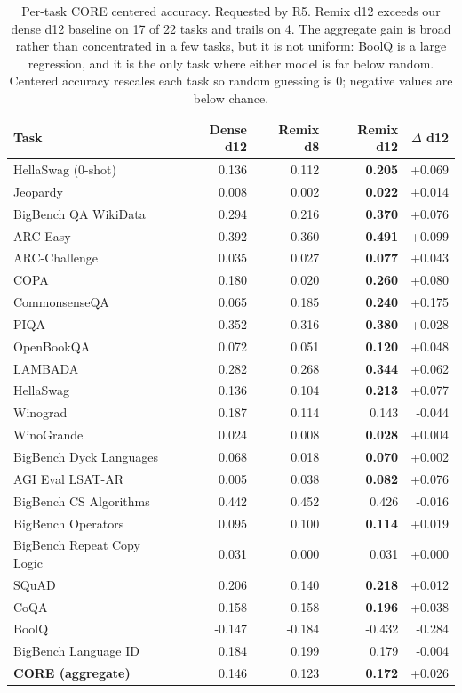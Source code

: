 \documentclass{article}
\begin{document}
\begin{table}[t]
\centering
\small
\caption{Per-task CORE centered accuracy. Requested by R5. Remix d12 exceeds our dense d12 baseline on 17 of 22 tasks and trails on 4. The aggregate gain is broad rather than concentrated in a few tasks, but it is not uniform: BoolQ is a large regression, and it is the only task where either model is far below random. Centered accuracy rescales each task so random guessing is 0; negative values are below chance.}
\label{tab:core_pertask}
\begin{tabular}{lrrrr}
\toprule
\textbf{Task} & \textbf{Dense d12} & \textbf{Remix d8} & \textbf{Remix d12} & \textbf{$\Delta$ d12} \\
\midrule
HellaSwag (0-shot) & 0.136 & 0.112 & \textbf{0.205} & +0.069 \\
Jeopardy & 0.008 & 0.002 & \textbf{0.022} & +0.014 \\
BigBench QA WikiData & 0.294 & 0.216 & \textbf{0.370} & +0.076 \\
ARC-Easy & 0.392 & 0.360 & \textbf{0.491} & +0.099 \\
ARC-Challenge & 0.035 & 0.027 & \textbf{0.077} & +0.043 \\
COPA & 0.180 & 0.020 & \textbf{0.260} & +0.080 \\
CommonsenseQA & 0.065 & 0.185 & \textbf{0.240} & +0.175 \\
PIQA & 0.352 & 0.316 & \textbf{0.380} & +0.028 \\
OpenBookQA & 0.072 & 0.051 & \textbf{0.120} & +0.048 \\
LAMBADA & 0.282 & 0.268 & \textbf{0.344} & +0.062 \\
HellaSwag & 0.136 & 0.104 & \textbf{0.213} & +0.077 \\
Winograd & 0.187 & 0.114 & 0.143 & -0.044 \\
WinoGrande & 0.024 & 0.008 & \textbf{0.028} & +0.004 \\
BigBench Dyck Languages & 0.068 & 0.018 & \textbf{0.070} & +0.002 \\
AGI Eval LSAT-AR & 0.005 & 0.038 & \textbf{0.082} & +0.076 \\
BigBench CS Algorithms & 0.442 & 0.452 & 0.426 & -0.016 \\
BigBench Operators & 0.095 & 0.100 & \textbf{0.114} & +0.019 \\
BigBench Repeat Copy Logic & 0.031 & 0.000 & 0.031 & +0.000 \\
SQuAD & 0.206 & 0.140 & \textbf{0.218} & +0.012 \\
CoQA & 0.158 & 0.158 & \textbf{0.196} & +0.038 \\
BoolQ & -0.147 & -0.184 & -0.432 & -0.284 \\
BigBench Language ID & 0.184 & 0.199 & 0.179 & -0.004 \\
\midrule
\textbf{CORE (aggregate)} & 0.146 & 0.123 & \textbf{0.172} & +0.026 \\
\bottomrule
\end{tabular}
\end{table}
\end{document}
